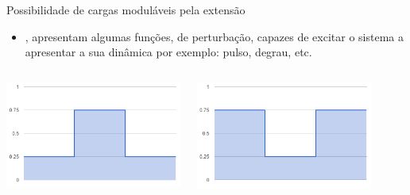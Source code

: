 \begin{frame}{Possibilidade de cargas moduláveis pela extensão}
	\begin{itemize}
		\item \cite{Hellerstein2004}, apresentam algumas funções, de perturbação, capazes de excitar o sistema a apresentar a sua dinâmica por exemplo: pulso, degrau, etc.
	\end{itemize}
	
	\begin{columns}
		\begin{minipage}[c][0.4\textheight][c]{\linewidth}
			\centering
			\includegraphics[width=0.84\linewidth]{../monograph/images/carga-sintetica1.png}
			\label{fig:degrau-positivo}
		\end{minipage}
		\begin{minipage}[c][0.4\textheight][t]{\linewidth}
			\centering
			\includegraphics[width=0.84\linewidth]{../monograph/images/carga-sintetica2.png}
			\label{fig:degrau-negativo}
		\end{minipage}
		\begin{minipage}[c][0.4\textheight][c]{\linewidth}
			\begin{enumerate}

\end{enumerate}
\end{minipage}
\end{columns}
\end{frame}
